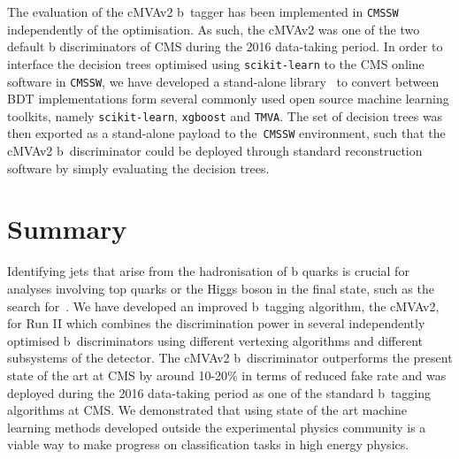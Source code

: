 The evaluation of the cMVAv2 b~tagger has been implemented in \texttt{CMSSW} independently of the optimisation. As such, the cMVAv2 was one of the two default b discriminators of CMS during the 2016 data-taking period. In order to interface the decision trees optimised using \texttt{scikit-learn} to the CMS online software in \texttt{CMSSW}, we have developed a stand-alone library~\cite{mlglue} to convert between BDT implementations form several commonly used open source machine learning toolkits, namely \texttt{scikit-learn}, \texttt{xgboost} and \texttt{TMVA}. The set of decision trees was then exported as a stand-alone payload to the~\texttt{CMSSW} environment, such that the cMVAv2 b~discriminator could be deployed through standard reconstruction software by simply evaluating the decision trees.

\section{Summary}
Identifying jets that arise from the hadronisation of b quarks is crucial for analyses involving top quarks or the Higgs boson in the final state, such as the search for~\ttHbb. We have developed an improved b~tagging algorithm, the cMVAv2, for Run II which combines the discrimination power in several independently optimised b~discriminators using different vertexing algorithms and different subsystems of the detector. The cMVAv2 b~discriminator outperforms the present state of the art at CMS by around 10-20\% in terms of reduced fake rate and was deployed during the 2016 data-taking period as one of the standard b~tagging algorithms at CMS. We demonstrated that using state of the art machine learning methods developed outside the experimental physics community is a viable way to make progress on classification tasks in high energy physics.
